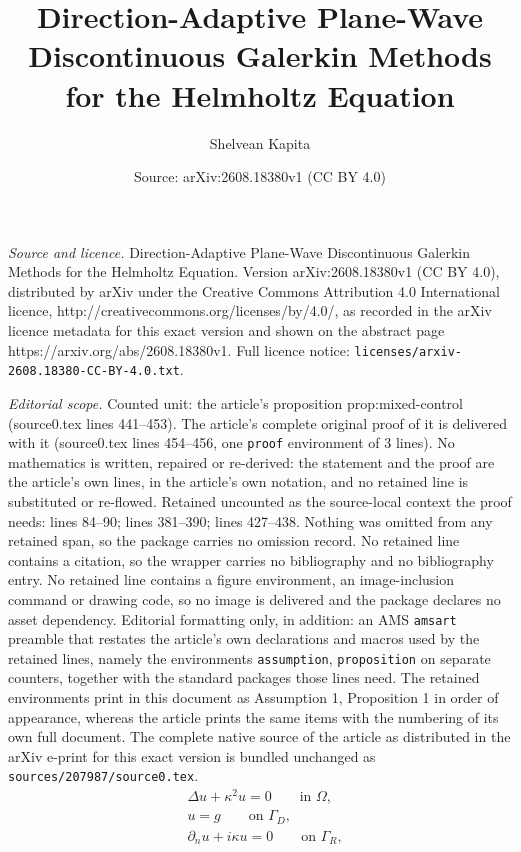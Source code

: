\documentclass[10pt,a4paper]{amsart}
\title{Direction-Adaptive Plane-Wave Discontinuous Galerkin Methods for the Helmholtz Equation}
\author{Shelvean Kapita}
\date{Source: arXiv:2608.18380v1 (CC BY 4.0)}
\begin{document}
\maketitle

\noindent\emph{Source and licence.} Direction-Adaptive Plane-Wave Discontinuous Galerkin Methods for the Helmholtz Equation. Version arXiv:2608.18380v1 (CC BY 4.0), distributed by arXiv under the Creative Commons Attribution 4.0 International licence, http://creativecommons.org/licenses/by/4.0/, as recorded in the arXiv licence metadata for this exact version and shown on the abstract page https://arxiv.org/abs/2608.18380v1. Full licence notice: \texttt{licenses/arxiv-2608.18380-CC-BY-4.0.txt}.\par\smallskip

\noindent\textit{Editorial scope.} Counted unit: the article's proposition prop:mixed-control (source0.tex lines 441--453). The article's complete original proof of it is delivered with it (source0.tex lines 454--456, one \texttt{proof} environment of 3 lines). No mathematics is written, repaired or re-derived: the statement and the proof are the article's own lines, in the article's own notation, and no retained line is substituted or re-flowed.  Retained uncounted as the source-local context the proof needs: lines 84--90; lines 381--390; lines 427--438.  Nothing was omitted from any retained span, so the package carries no omission record.  No retained line contains a citation, so the wrapper carries no bibliography and no bibliography entry.  No retained line contains a figure environment, an image-inclusion command or drawing code, so no image is delivered and the package declares no asset dependency.  Editorial formatting only, in addition: an AMS \texttt{amsart} preamble that restates the article's own declarations and macros used by the retained lines, namely the environments \texttt{assumption}, \texttt{proposition} on separate counters, together with the standard packages those lines need.  The retained environments print in this document as Assumption 1, Proposition 1 in order of appearance, whereas the article prints the same items with the numbering of its own full document.  The complete native source of the article as distributed in the arXiv e-print for this exact version is bundled unchanged as \texttt{sources/207987/source0.tex}.
\begin{equation}\label{eq:model}
 \begin{aligned}
  &\Delta u+\kappa^2u=0 \qquad \text{in }\Omega,\\
  &u=g \qquad \text{on }\Gamma_D,\\
  &\partial_nu+i\kappa u=0 \qquad \text{on }\Gamma_R,
 \end{aligned}
\end{equation}
\end{document}
